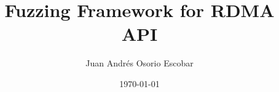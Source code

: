 \documentclass[a4paper]{article}
\begin{document}
\title{Fuzzing Framework for RDMA API}
\author{Juan Andrés Osorio Escobar}
\date{\today}
\maketitle



\tableofcontents











\end{document}
